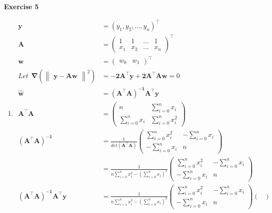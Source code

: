 \documentclass[11pt,letter,notitlepage]{article}
\begin{document}
\begin{solution}
	\textbf{Exercise 5}
	\begin{enumerate}
		\item
		\begin{align*}
 			\mathbf{y}&=(y_1,y_2,\dots,y_n)^{\top}\\
 			\mathbf{A}&=
			\begin{pmatrix}
				1 & 1 & \dots & 1\\
				x_1 & x_2 & \dots & x_n
			\end{pmatrix}^{\top}\\
 			\mathbf{w}&=
			\begin{pmatrix}
				w_0 & w_1
			\end{pmatrix}^{\top}\\
			Let~~\mathbf{\nabla}(\begin{Vmatrix}
								\mathbf{y-Aw}
			                \end{Vmatrix}^2)
			&=\mathbf{-2A^{\top}y+2A^{\top}Aw}=0\\
			\mathbf{\hat{w}}&=\mathbf{(A^{\top}A)^{-1}A^{\top}y}\\
			\mathbf{A^{\top}A}&=
			\begin{pmatrix}
				n & \sum\limits_{i=0}^n{x_i}\\
				\sum\limits_{i=0}^n{x_i} & \sum\limits_{i=0}^n{x_i^2}
			\end{pmatrix}\\
			\mathbf{(A^{\top}A)^{-1}}
			&=\frac{1}{det(\mathbf{A^{\top}A})}
			\begin{pmatrix}
				\sum\limits_{i=0}^n{x_i^2} & -\sum\limits_{i=0}^n{x_i}\\
				-\sum\limits_{i=0}^n{x_i} & n
			\end{pmatrix}\\
			&=\frac{1}{n\sum\limits_{i=0}^n{x_i^2}-(\sum\limits_{i=0}^n{x_i})^2}
			\begin{pmatrix}
				\sum\limits_{i=0}^n{x_i^2} & -\sum\limits_{i=0}^n{x_i}\\
				-\sum\limits_{i=0}^n{x_i} & n
			\end{pmatrix}\\
			\mathbf{(A^{\top}A)^{-1}A^{\top}y}
			&=\frac{1}{n\sum\limits_{i=1}^n{x_i^2}-(\sum\limits_{i=0}^n{x_i})^2}
			\begin{pmatrix}
				\sum\limits_{i=0}^n{x_i^2} & -\sum\limits_{i=0}^n{x_i}\\
				-\sum\limits_{i=0}^n{x_i} & n
			\end{pmatrix}
			\begin{pmatrix}

\end{pmatrix}
\end{align*}
\end{enumerate}
\end{solution}
\end{document}
